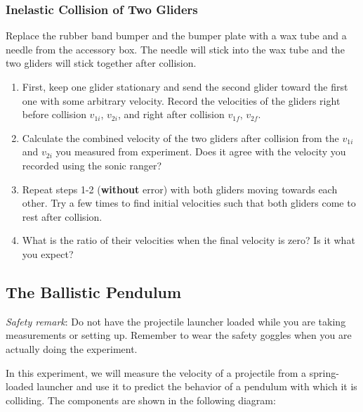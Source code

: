 \subsubsection{Inelastic Collision of Two Gliders}

Replace the rubber band bumper and the bumper plate with a wax tube and a needle from the accessory box. The needle will stick into the wax tube and the two gliders will stick together after collision.
\begin{enumerate}
  \item First, keep one glider stationary and send the second glider toward the first one with some arbitrary velocity. Record the velocities of the gliders right before collision $v_{1i}$, $v_{2i}$, and right after collision $v_{1f}$, $v_{2f}$.
  \item Calculate the combined velocity of the two gliders after collision from the $v_{1i}$ and $v_{2i}$ you measured from experiment. Does it agree with the velocity you recorded using the sonic ranger?
  \item Repeat  steps 1-2 (\textbf{without} error) with both gliders moving towards each other. Try a few times to find initial velocities such that both gliders come to rest after collision.
  \item What is the ratio of their velocities when the final velocity is zero? Is it what you expect?
\end{enumerate}

\subsection{The Ballistic Pendulum}
\emph{Safety remark}: Do not have the projectile launcher loaded while you are taking measurements or setting up. Remember to wear the safety goggles when you are actually doing the experiment.\myskip

In this experiment, we will measure the velocity of a projectile from a spring-loaded launcher and use it to predict the behavior of a pendulum with which it is colliding. The components are shown in the following diagram:

